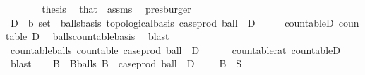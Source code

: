 \begin{isabellebody}
\ \ \ \ \isamarkupfalse%
\ \isamarkupfalse%
\ {\isacharquery}{\kern0pt}thesis\ \isamarkupfalse%
\ that\ {\isacharasterisk}{\kern0pt}\ assms{\isacharparenleft}{\kern0pt}{}{\isacharparenright}{\kern0pt}\ \isamarkupfalse%
\ presburger\isanewline
\ \ \isamarkupfalse%
\isanewline
\isanewline
\ \ \isamarkupfalse%
\ D\ {\isacharcolon}{\kern0pt}{\isacharcolon}{\kern0pt}\ {\isachardoublequoteopen}{\isacharprime}{\kern0pt}b\ set{\isachardoublequoteclose}\ \ balls{\isacharunderscore}{\kern0pt}basis{\isacharcolon}{\kern0pt}\ {\isachardoublequoteopen}topological{\isacharunderscore}{\kern0pt}basis\ {\isacharparenleft}{\kern0pt}case{\isacharunderscore}{\kern0pt}prod\ ball\ {\isacharbackquote}{\kern0pt}\ {\isacharparenleft}{\kern0pt}D\ {\isasymtimes}\ {\isacharparenleft}{\kern0pt}{\isasymrat}\ {\isasyminter}\ {\isacharbraceleft}{\kern0pt}{}{\isacharless}{\kern0pt}{\isachardot}{\kern0pt}{\isachardot}{\kern0pt}{\isacharbraceright}{\kern0pt}{\isacharparenright}{\kern0pt}{\isacharparenright}{\kern0pt}{\isacharparenright}{\kern0pt}{\isachardoublequoteclose}\ \ countable{\isacharunderscore}{\kern0pt}D{\isacharcolon}{\kern0pt}\ {\isachardoublequoteopen}countable\ D{\isachardoublequoteclose}\ \isamarkupfalse%
\ balls{\isacharunderscore}{\kern0pt}countable{\isacharunderscore}{\kern0pt}basis\ \isamarkupfalse%
\ blast\isanewline
\ \ \isamarkupfalse%
\ countable{\isacharunderscore}{\kern0pt}balls{\isacharcolon}{\kern0pt}\ {\isachardoublequoteopen}countable\ {\isacharparenleft}{\kern0pt}case{\isacharunderscore}{\kern0pt}prod\ ball\ {\isacharbackquote}{\kern0pt}\ {\isacharparenleft}{\kern0pt}D\ {\isasymtimes}\ {\isacharparenleft}{\kern0pt}{\isasymrat}\ {\isasyminter}\ {\isacharbraceleft}{\kern0pt}{}{\isacharless}{\kern0pt}{\isachardot}{\kern0pt}{\isachardot}{\kern0pt}{\isacharbraceright}{\kern0pt}{\isacharparenright}{\kern0pt}{\isacharparenright}{\kern0pt}{\isacharparenright}{\kern0pt}{\isachardoublequoteclose}\ \isamarkupfalse%
\ countable{\isacharunderscore}{\kern0pt}rat\ countable{\isacharunderscore}{\kern0pt}D\ \isamarkupfalse%
\ blast\isanewline
\isanewline
\ \ \isamarkupfalse%
\ B\ \ B{\isacharunderscore}{\kern0pt}balls{\isacharcolon}{\kern0pt}\ {\isachardoublequoteopen}B\ {\isasymsubseteq}\ case{\isacharunderscore}{\kern0pt}prod\ ball\ {\isacharbackquote}{\kern0pt}\ {\isacharparenleft}{\kern0pt}D\ {\isasymtimes}\ {\isacharparenleft}{\kern0pt}{\isasymrat}\ {\isasyminter}\ {\isacharbraceleft}{\kern0pt}{}{\isacharless}{\kern0pt}{\isachardot}{\kern0pt}{\isachardot}{\kern0pt}{\isacharbraceright}{\kern0pt}{\isacharparenright}{\kern0pt}{\isacharparenright}{\kern0pt}{\isachardoublequoteclose}\ {\isachardoublequoteopen}{\isasymUnion}B\ {\isacharequal}{\kern0pt}\ {\isacharminus}{\kern0pt}S{\isachardoublequoteclose}\ \isamarkupfalse%

\end{isabellebody}
